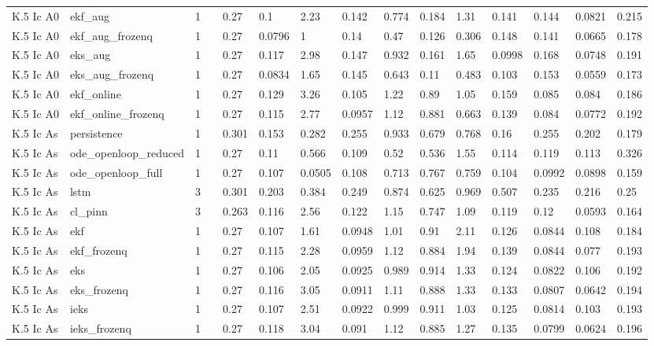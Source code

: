 \begin{table}[t]
\begin{tabular}{lllllllllllllll}
K.5 Ic A0 & ekf\_aug & 1 &  & 0.27 & 0.1 & 2.23 & 0.142 & 0.774 & 0.184 & 1.31 & 0.141 & 0.144 & 0.0821 & 0.215 \\
K.5 Ic A0 & ekf\_aug\_frozenq & 1 &  & 0.27 & 0.0796 & 1 & 0.14 & 0.47 & 0.126 & 0.306 & 0.148 & 0.141 & 0.0665 & 0.178 \\
K.5 Ic A0 & eks\_aug & 1 &  & 0.27 & 0.117 & 2.98 & 0.147 & 0.932 & 0.161 & 1.65 & 0.0998 & 0.168 & 0.0748 & 0.191 \\
K.5 Ic A0 & eks\_aug\_frozenq & 1 &  & 0.27 & 0.0834 & 1.65 & 0.145 & 0.643 & 0.11 & 0.483 & 0.103 & 0.153 & 0.0559 & 0.173 \\
K.5 Ic A0 & ekf\_online & 1 &  & 0.27 & 0.129 & 3.26 & 0.105 & 1.22 & 0.89 & 1.05 & 0.159 & 0.085 & 0.084 & 0.186 \\
K.5 Ic A0 & ekf\_online\_frozenq & 1 &  & 0.27 & 0.115 & 2.77 & 0.0957 & 1.12 & 0.881 & 0.663 & 0.139 & 0.084 & 0.0772 & 0.192 \\
K.5 Ic As & persistence & 1 &  & 0.301 & 0.153 & 0.282 & 0.255 & 0.933 & 0.679 & 0.768 & 0.16 & 0.255 & 0.202 & 0.179 \\
K.5 Ic As & ode\_openloop\_reduced & 1 &  & 0.27 & 0.11 & 0.566 & 0.109 & 0.52 & 0.536 & 1.55 & 0.114 & 0.119 & 0.113 & 0.326 \\
K.5 Ic As & ode\_openloop\_full & 1 &  & 0.27 & 0.107 & 0.0505 & 0.108 & 0.713 & 0.767 & 0.759 & 0.104 & 0.0992 & 0.0898 & 0.159 \\
K.5 Ic As & lstm & 3 &  & 0.301 & 0.203 & 0.384 & 0.249 & 0.874 & 0.625 & 0.969 & 0.507 & 0.235 & 0.216 & 0.25 \\
K.5 Ic As & cl\_pinn & 3 &  & 0.263 & 0.116 & 2.56 & 0.122 & 1.15 & 0.747 & 1.09 & 0.119 & 0.12 & 0.0593 & 0.164 \\
K.5 Ic As & ekf & 1 &  & 0.27 & 0.107 & 1.61 & 0.0948 & 1.01 & 0.91 & 2.11 & 0.126 & 0.0844 & 0.108 & 0.184 \\
K.5 Ic As & ekf\_frozenq & 1 &  & 0.27 & 0.115 & 2.28 & 0.0959 & 1.12 & 0.884 & 1.94 & 0.139 & 0.0844 & 0.077 & 0.193 \\
K.5 Ic As & eks & 1 &  & 0.27 & 0.106 & 2.05 & 0.0925 & 0.989 & 0.914 & 1.33 & 0.124 & 0.0822 & 0.106 & 0.192 \\
K.5 Ic As & eks\_frozenq & 1 &  & 0.27 & 0.116 & 3.05 & 0.0911 & 1.11 & 0.888 & 1.33 & 0.133 & 0.0807 & 0.0642 & 0.194 \\
K.5 Ic As & ieks & 1 &  & 0.27 & 0.107 & 2.51 & 0.0922 & 0.999 & 0.911 & 1.03 & 0.125 & 0.0814 & 0.103 & 0.193 \\
K.5 Ic As & ieks\_frozenq & 1 &  & 0.27 & 0.118 & 3.04 & 0.091 & 1.12 & 0.885 & 1.27 & 0.135 & 0.0799 & 0.0624 & 0.196 \\

\end{tabular}
\end{table}

